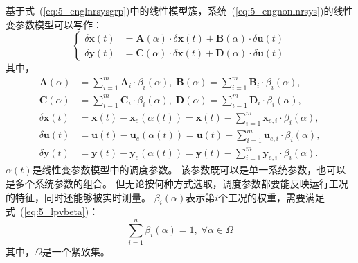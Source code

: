 \documentclass{article}
\begin{document}
基于式~(\ref{eq:5_englnrsysgrp})中的线性模型簇，系统~(\ref{eq:5_engnonlnrsys})的线性变参数模型可以写作：
\begin{equation}
\left \{
\begin{aligned}
  \delta \dot{\bm{x}}(t)&=\mathbf{A}(\alpha)\cdot \delta \bm{x}(t)+\mathbf{B}(\alpha)\cdot \delta \bm{u}(t)\\
  \delta \bm{y}(t)&=\mathbf{C}(\alpha)\cdot\delta \bm{x}(t)+\mathbf{D}(\alpha)\cdot \delta \bm{u}(t)
\end{aligned}
\right .
\label{eq:5_stdmdllpv}
\end{equation}
其中，
\begin{equation}
\begin{aligned}
  \mathbf{A}(\alpha) &= \sum_{i=1}^{m}\mathbf{A}_{i}\cdot \beta_i(\alpha),\; \mathbf{B}(\alpha) = \sum_{i=1}^{m}\mathbf{B}_{i}\cdot \beta_i(\alpha),\\
  \mathbf{C}(\alpha) &= \sum_{i=1}^{m}\mathbf{C}_{i}\cdot \beta_i(\alpha),\; \mathbf{D}(\alpha) = \sum_{i=1}^{m}\mathbf{D}_{i}\cdot \beta_i(\alpha),\\
  \delta \bm{x}(t)&=\bm{x}(t)-\bm{x}_e(\alpha(t))=\bm{x}(t)-\sum_{i=1}^{m}\bm{x}_{e,i}\cdot \beta_i(\alpha),\\
  \delta \bm{u}(t)&=\bm{u}(t)-\bm{u}_e(\alpha(t))=\bm{u}(t)-\sum_{i=1}^{m}\bm{u}_{e,i}\cdot \beta_i(\alpha),\\
  \delta \bm{y}(t)&=\bm{y}(t)-\bm{y}_e(\alpha(t))=\bm{y}(t)-\sum_{i=1}^{m}\bm{y}_{e,i}\cdot \beta_i(\alpha).
\label{eq:5_lpvfactors}
\end{aligned}
\end{equation}
$\alpha(t)$是线性变参数模型中的调度参数。
该参数既可以是单一系统参数，也可以是多个系统参数的组合。
但无论按何种方式选取，调度参数都要能反映运行工况的特征，同时还能够被实时测量。
$\beta_i(\alpha)$表示第$i$个工况的权重，需要满足式~(\ref{eq:5_lpvbeta})：
\begin{equation}
  \sum_{i=1}^{n}\beta_i(\alpha)=1,\;\forall \alpha\in\Omega
\label{eq:5_lpvbeta}
\end{equation}
其中，$\Omega$是一个紧致集。
\end{document}

